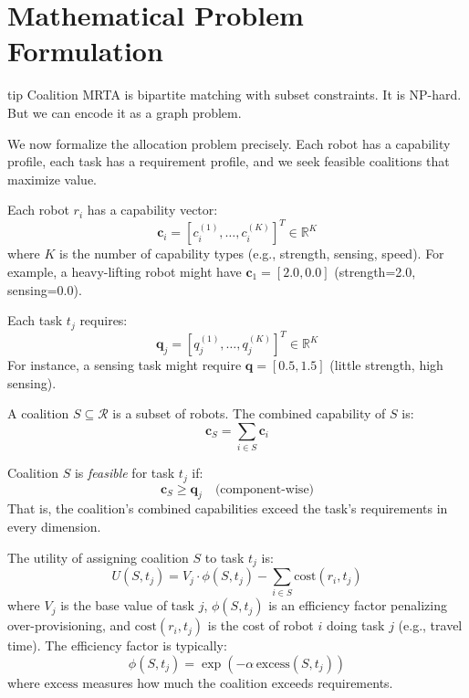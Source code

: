 \section{Mathematical Problem Formulation}
\begin{block}{tip}
Coalition MRTA is bipartite matching with subset constraints. It is NP-hard. But we can encode it as a graph problem.
\end{block}

\label{sec:cmrta-formulation}

We now formalize the allocation problem precisely. Each robot has a capability profile, each task has a requirement profile, and we seek feasible coalitions that maximize value.

\begin{definition}
Each robot $r_i$ has a capability vector:
\[
\mathbf{c}_i = [c_i^{(1)}, \ldots, c_i^{(K)}]^T \in \mathbb{R}^K
\]
where $K$ is the number of capability types (e.g., strength, sensing, speed). For example, a heavy-lifting robot might have $\mathbf{c}_1 = [2.0, 0.0]$ (strength=2.0, sensing=0.0).
\end{definition}

\begin{definition}
Each task $t_j$ requires:
\[
\mathbf{q}_j = [q_j^{(1)}, \ldots, q_j^{(K)}]^T \in \mathbb{R}^K
\]
For instance, a sensing task might require $\mathbf{q} = [0.5, 1.5]$ (little strength, high sensing).
\end{definition}

\begin{definition}[Coalition]
A coalition $S \subseteq \mathcal{R}$ is a subset of robots. The combined capability of $S$ is:
\[
\mathbf{c}_S = \sum_{i \in S} \mathbf{c}_i
\]
\end{definition}

\begin{definition}[Feasibility]
Coalition $S$ is \textit{feasible} for task $t_j$ if:
\[
\mathbf{c}_S \geq \mathbf{q}_j \quad \text{(component-wise)}
\]
That is, the coalition's combined capabilities exceed the task's requirements in every dimension.
\end{definition}

\begin{definition}
The utility of assigning coalition $S$ to task $t_j$ is:
\[
U(S, t_j) = V_j \cdot \phi(S, t_j) - \sum_{i \in S} \text{cost}(r_i, t_j)
\]
where $V_j$ is the base value of task $j$, $\phi(S, t_j)$ is an efficiency factor penalizing over-provisioning, and $\text{cost}(r_i, t_j)$ is the cost of robot $i$ doing task $j$ (e.g., travel time). The efficiency factor is typically:
\[
\phi(S, t_j) = \exp\left(-\alpha \, \text{excess}(S, t_j)\right)
\]
where $\text{excess}$ measures how much the coalition exceeds requirements.
\end{definition}

